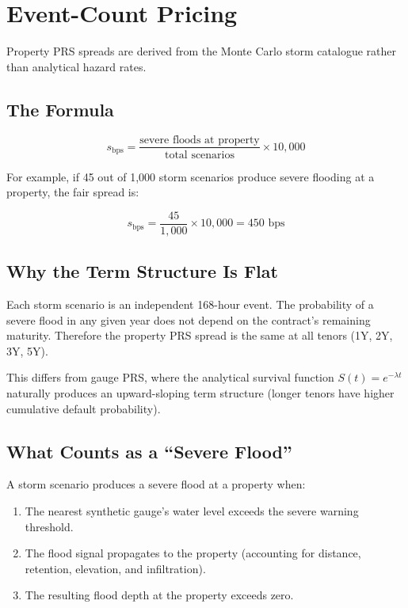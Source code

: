\documentclass[11pt,a4paper]{article}
\begin{document}
\section{Event-Count Pricing}

Property PRS spreads are derived from the Monte Carlo storm catalogue
rather than analytical hazard rates.

\subsection{The Formula}

\[
  s_{\mathrm{bps}} = \frac{\text{severe floods at property}}{\text{total scenarios}} \times 10{,}000
\]

\noindent For example, if 45 out of 1,000 storm scenarios produce severe
flooding at a property, the fair spread is:

\[
  s_{\mathrm{bps}} = \frac{45}{1{,}000} \times 10{,}000 = 450 \text{ bps}
\]

\subsection{Why the Term Structure Is Flat}

Each storm scenario is an independent 168-hour event.  The probability
of a severe flood in any given year does not depend on the contract's
remaining maturity.  Therefore the property PRS spread is the same at
all tenors (1Y, 2Y, 3Y, 5Y).

This differs from gauge PRS, where the analytical survival function
$S(t) = e^{-\lambda t}$ naturally produces an upward-sloping term
structure (longer tenors have higher cumulative default probability).

\subsection{What Counts as a ``Severe Flood''}

A storm scenario produces a severe flood at a property when:
\begin{enumerate}
  \item The nearest synthetic gauge's water level exceeds the severe
        warning threshold.
  \item The flood signal propagates to the property (accounting for
        distance, retention, elevation, and infiltration).
  \item The resulting flood depth at the property exceeds zero.
\end{enumerate}
\end{document}
